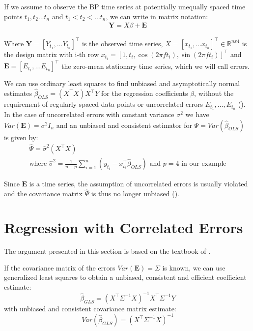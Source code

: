 If we assume to observe the BP time series at potentially unequally spaced
time points $t_1, t_2 \dots t_n$ and $t_1 < t_2 < \dots t_n$, we can write in matrix notation:
\begin{gather*}
\mathbf{Y} = X \beta + \mathbf{E}
\end{gather*}

Where $\mathbf{Y} = [Y_{t_1}, \dots Y_{t_n}]^{\top}$ is the observed time series,
$X = [x_{t_1}, \dots x_{t_n}]^{\top} \in \mathbb{R}^{nx4}$ is the design matrix with i-th row
$x_{t_i} = [1, t_i, \cos(2 \pi f t_i), \sin(2 \pi f t_i)]^{\top}$
and $\mathbf{E} = [E_{t_1}, \dots E_{t_n}]^{\top}$ the zero-mean stationary time series,
which we will call errors.

We can use ordinary least squares to find unbiased and asymptotically normal estimates $\hat{\beta}_{OLS} = (X^{\top}X) X^{\top}Y$
for the regression coefficients $\beta$, without the requirement of regularly spaced data points or uncorrelated errors
$E_{t_1}, \dots, E_{t_n}$ (\citeauthor{white_asymptotic_2001}).
In the case of uncorrelated errors with constant variance $\sigma^2$ we have
$Var(\mathbf{E}) = \sigma^2 I_n$ and an unbiased and consistent estimator for $\Psi = Var(\hat{\beta}_{OLS})$ is given by:
\begin{gather*}
\hat{\Psi} = \hat{\sigma}^2(X^{\top}X) \\
    \text{where $\hat{\sigma}^2=\frac{1}{n-p} \sum_{i = 1}^{n} (y_{t_i} - x_{t_i}^{\top} \hat{\beta}_{OLS})$ and $p=4$ in our example}
\end{gather*}

Since $\mathbf{E}$ is a time series, the assumption of uncorrelated errors is usually violated and the
covariance matrix $\hat{\Psi}$ is thus no longer unbiased (\citeauthor{brockwell_introduction_2016}).

\section{Regression with Correlated Errors}

The argument presented in this section is based on the textbook of \citeauthor{brockwell_introduction_2016}.

If the covariance matrix of the errors $Var(\mathbf{E}) = \Sigma$ is known,
we can use generalized least squares to obtain a unbiased, consistent and efficient coefficient estimate:
\[\hat{\beta}_{GLS} = (X^{\top} \Sigma^{-1} X)^{-1} X^{\top} \Sigma^{-1} Y\]
with unbiased and consistent covariance matrix estimate:
\[Var(\hat{\beta}_{GLS}) = (X^{\top} \Sigma^{-1} X)^{-1}\]

